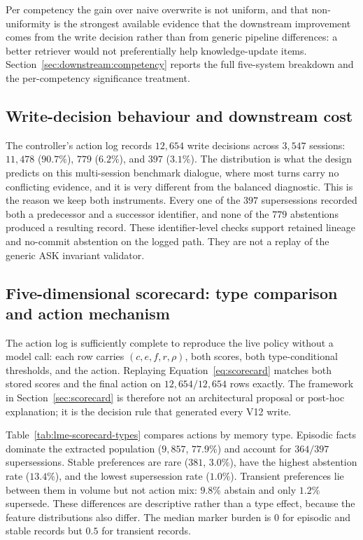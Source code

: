 

Per competency the gain over naive overwrite is not uniform, and that
non-uniformity is the strongest available evidence that the downstream
improvement comes from the write decision rather than from generic pipeline
differences: a better retriever would not preferentially help knowledge-update
items. Section~\ref{sec:downstream:competency} reports the full five-system
breakdown and the per-competency significance treatment.

\subsection{Write-decision behaviour and downstream cost}

The controller's action log records $12{,}654$ write decisions across $3{,}547$
sessions: $11{,}478$ \keep{} ($90.7\%$), $779$ \abstain{} ($6.2\%$), and $397$
\supersede{} ($3.1\%$). The distribution is what the design predicts on this
multi-session benchmark dialogue, where most turns carry no conflicting
evidence, and it is very different from the balanced \mgpc{} diagnostic. This is
the reason we keep both instruments. Every one of the $397$ supersessions recorded both a
predecessor and a successor identifier, and none of the $779$ abstentions
produced a resulting record. These identifier-level checks support retained
lineage and no-commit abstention on the logged path. They are not a replay of
the generic ASK invariant validator.

\subsection{Five-dimensional scorecard: type comparison and action mechanism}
\label{sec:downstream:scorecard}

The action log is sufficiently complete to reproduce the live policy without a
model call: each row carries $(c,e,f,r,\rho)$, both scores, both
type-conditional thresholds, and the action. Replaying
Equation~\ref{eq:scorecard} matches both stored scores and the final action on
$12{,}654/12{,}654$ rows exactly. The framework in
Section~\ref{sec:scorecard} is therefore not an architectural proposal or
post-hoc explanation; it is the decision rule that generated every V12 write.

Table~\ref{tab:lme-scorecard-types} compares actions by memory type. Episodic
facts dominate the extracted population ($9{,}857$, $77.9\%$) and account for
$364/397$ supersessions. Stable preferences are rare ($381$, $3.0\%$), have the
highest abstention rate ($13.4\%$), and the lowest supersession rate ($1.0\%$).
Transient preferences lie between them in volume but not action mix: $9.8\%$
abstain and only $1.2\%$ supersede. These differences are descriptive rather
than a type effect, because the feature distributions also differ. The
median marker burden is $0$ for episodic and stable records but $0.5$ for
transient records.

